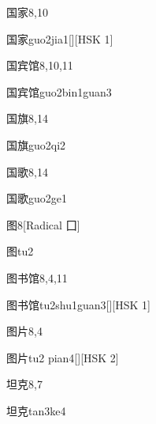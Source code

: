 \begin{entry}{国家}{8,10}
  \begin{phonetics}{国家}{guo2jia1}[][HSK 1]
  \end{phonetics}
\end{entry}

\begin{entry}{国宾馆}{8,10,11}
  \begin{phonetics}{国宾馆}{guo2bin1guan3}
  \end{phonetics}
\end{entry}

\begin{entry}{国旗}{8,14}
  \begin{phonetics}{国旗}{guo2qi2}
  \end{phonetics}
\end{entry}

\begin{entry}{国歌}{8,14}
  \begin{phonetics}{国歌}{guo2ge1}
  \end{phonetics}
\end{entry}

\begin{entry}{图}{8}[Radical 囗]
  \begin{phonetics}{图}{tu2}
  \end{phonetics}
\end{entry}

\begin{entry}{图书馆}{8,4,11}
  \begin{phonetics}{图书馆}{tu2shu1guan3}[][HSK 1]
  \end{phonetics}
\end{entry}

\begin{entry}{图片}{8,4}
  \begin{phonetics}{图片}{tu2 pian4}[][HSK 2]
  \end{phonetics}
\end{entry}

\begin{entry}{坦克}{8,7}
  \begin{phonetics}{坦克}{tan3ke4}
  \end{phonetics}
\end{entry}

